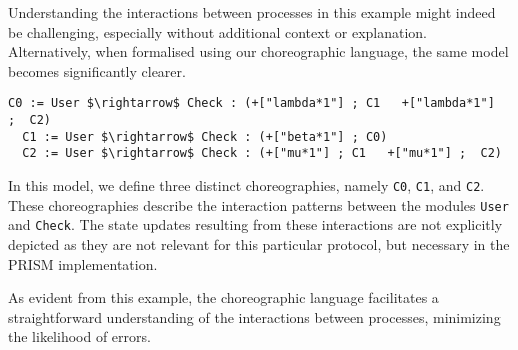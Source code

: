 Understanding the interactions between processes in this example might
indeed be challenging, especially without additional context or
explanation.  Alternatively, when formalised using our choreographic
language, the same model becomes significantly clearer.
\begin{lstlisting}[style=chor-color,% caption={Example of Listing \ref{example1} in our choreographic language},captionpos=b,
  frame=none, label={example2}]
  C0 := User $\rightarrow$ Check : (+["lambda*1"] ; C1	 +["lambda*1"]  ;  C2)
  C1 := User $\rightarrow$ Check : (+["beta*1"] ; C0)  
  C2 := User $\rightarrow$ Check : (+["mu*1"] ; C1   +["mu*1"] ;  C2)
\end{lstlisting}
In this model, we define three distinct choreographies, namely
\texttt{C0}, \texttt{C1}, and \texttt{C2}. These choreographies
describe the interaction patterns between the modules \texttt{User}
and \texttt{Check}. The state updates resulting from these
interactions are not explicitly depicted as they are not relevant for
this particular protocol, but necessary in the PRISM implementation.
%


As evident from this example, the choreographic language facilitates a
straightforward understanding of the interactions between processes,
minimizing the likelihood of errors.



